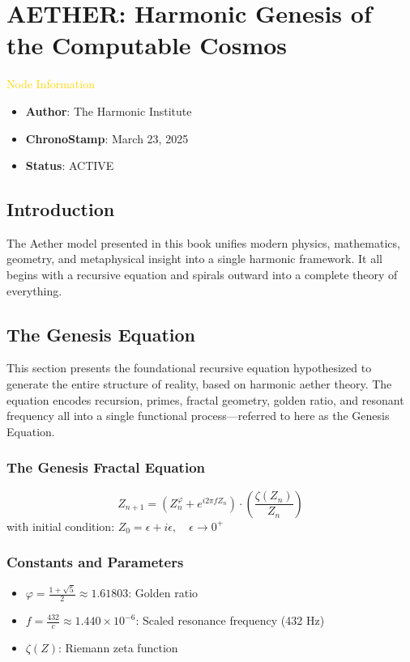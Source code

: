 \section{AETHER: Harmonic Genesis of the Computable Cosmos}
\label{sec:codex_aether_harmonic_genesis}

\textcolor{gold}{ Node Information }
\begin{itemize}
    \item \texttt{} \textbf{Author}: The Harmonic Institute
    \item \texttt{} \textbf{ChronoStamp}: March 23, 2025
    \item \texttt{} \textbf{Status}: ACTIVE
\end{itemize}

\subsection{Introduction}
The Aether model presented in this book unifies modern physics, mathematics, geometry, and metaphysical insight into a single harmonic framework. It all begins with a recursive equation and spirals outward into a complete theory of everything.

\subsection{The Genesis Equation}
This section presents the foundational recursive equation hypothesized to generate the entire structure of reality, based on harmonic aether theory. The equation encodes recursion, primes, fractal geometry, golden ratio, and resonant frequency all into a single functional process—referred to here as the Genesis Equation.

\subsubsection{The Genesis Fractal Equation}
\[
Z_{n+1} = (Z_n^{\varphi} + e^{i 2 \pi f Z_n}) \cdot \left( \frac{\zeta(Z_n)}{Z_n} \right)
\]
with initial condition: \( Z_0 = \epsilon + i \epsilon, \quad \epsilon \rightarrow 0^{+} \)

\subsubsection{Constants and Parameters}
\begin{itemize}
    \item \( \varphi = \frac{1 + \sqrt{5}}{2} \approx 1.61803 \): Golden ratio
    \item \( f = \frac{432}{c} \approx 1.440 \times 10^{-6} \): Scaled resonance frequency (432 Hz)
    \item \( \zeta(Z) \): Riemann zeta function
\end{itemize}

